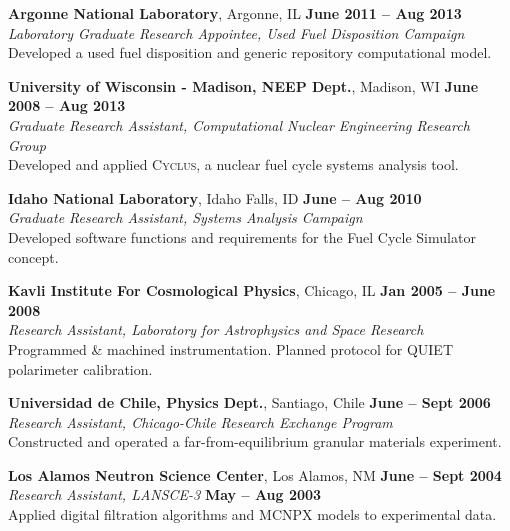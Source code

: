 \documentclass[margin,line]{resume}
\newcommand{\Cyclus}{\textsc{Cyclus}\xspace}%
\begin{document}
\begin{resume}
    \textbf{Argonne National Laboratory}, Argonne, IL \hfill \textbf{June 2011 -- Aug 2013}\\
		\textsl{Laboratory Graduate Research Appointee, Used Fuel Disposition Campaign}\\
		Developed a used fuel disposition and generic repository computational model.

    \textbf{University of Wisconsin - Madison, NEEP Dept.}, Madison, WI \hfill \textbf{June 2008 -- Aug 2013}\\
		\textsl{Graduate Research Assistant, Computational Nuclear Engineering Research Group}\\
		Developed and applied \Cyclus, a nuclear fuel cycle systems analysis tool.

    \textbf{Idaho National Laboratory}, Idaho Falls, ID \hfill \textbf{June -- Aug 2010}\\
		\textsl{Graduate Research Assistant, Systems Analysis Campaign}\\
		Developed software functions and requirements for the Fuel Cycle Simulator concept.

    \textbf{Kavli Institute For Cosmological Physics}, Chicago, IL \hfill \textbf{Jan 2005 -- June 2008}\\
                \textsl{Research Assistant, Laboratory for Astrophysics and Space Research}\\
                Programmed \& machined instrumentation. Planned protocol for QUIET polarimeter calibration.

    \textbf{Universidad de Chile, Physics Dept.}, Santiago, Chile \hfill \textbf{June -- Sept 2006}\\
                \textsl{Research Assistant, Chicago-Chile Research Exchange Program}\\
                 Constructed and operated a far-from-equilibrium granular materials experiment.

    \textbf{Los Alamos Neutron Science Center}, Los Alamos, NM \hfill \textbf{June -- Sept 2004}\\
                \textsl{Research Assistant, LANSCE-3} \hfill \textbf{May -- Aug 2003}\\
                Applied digital filtration algorithms and MCNPX models to experimental data.
    \pagebreak

               \vspace{-2mm}

\end{resume}
\end{document}
